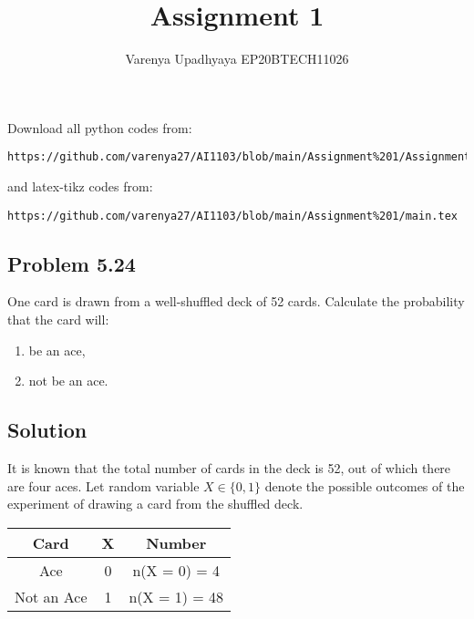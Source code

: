 \documentclass[journal,12pt,twocolumn]{IEEEtran}
\title{Assignment 1}
\author{Varenya Upadhyaya EP20BTECH11026}
\date{}
\begin{document}
\maketitle
Download all python codes from: 
\begin{lstlisting}
https://github.com/varenya27/AI1103/blob/main/Assignment%201/Assignment_1.py
\end{lstlisting}
and latex-tikz codes from:
\begin{lstlisting}
https://github.com/varenya27/AI1103/blob/main/Assignment%201/main.tex
\end{lstlisting}
\maketitle   
\begin{center}
\section*{Problem 5.24}
\end{center}
One card is drawn from a well-shuffled deck of 52 cards. Calculate the probability that the card will:
\begin{enumerate}[label=(\roman*)]
    \item be an ace,
    \item not be an ace.
\end{enumerate}
\begin{center}
\maketitle
    \section*{Solution}
\end{center}
It is known that the total number of cards in the deck is 52, out of which there are four aces. Let random variable $X \in \{0,1\}$ denote the possible outcomes of the experiment of drawing a card from the shuffled deck.\\
\begin{center}
    \begin{tabular}{|c|c|c|}
    \hline
    \textbf{Card} & \textbf{X} & \textbf{Number}\\
    \hline
    Ace & 0 & n(X = 0) = 4\\
    \hline
    Not an Ace & 1 & n(X = 1) = 48\\
    \hline
    \end{tabular}
\end{center}
\end{document}
